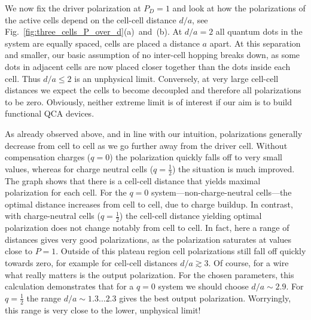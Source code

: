 We now fix the driver polarization at $P_D = 1$ and look at how the
polarizations of the active cells depend on the cell-cell distance $d/a$, see
Fig.~\ref{fig:three_cells_P_over_d}(a)~and~(b). At $d/a = 2$ all quantum dots in
the system are equally spaced, cells are placed a distance $a$ apart. At this
separation and smaller, our basic assumption of no inter-cell hopping breaks
down, as some dots in adjacent cells are now placed closer together than the
dots inside each cell. Thus $d/a \le 2$ is an unphysical limit. Conversely, at
very large cell-cell distances we expect the cells to become decoupled and
therefore all polarizations to be zero. Obviously, neither extreme limit is of
interest if our aim is to build functional QCA devices.

As already observed above, and in line with our intuition, polarizations
generally decrease from cell to cell as we go further away from the driver cell.
Without compensation charges ($q=0$) the polarization quickly falls off to very
small values, whereas for charge neutral cells ($q = \frac{1}{2}$) the situation
is much improved. The graph shows that there is a cell-cell distance that yields
maximal polarization for each cell. For the $q=0$ system---non-charge-neutral
cells---the optimal distance increases from cell to cell, due to charge buildup.
In contrast, with charge-neutral cells ($q=\frac{1}{2}$) the cell-cell distance
yielding optimal polarization does not change notably from cell to cell. In
fact, here a range of distances gives very good polarizations, as the
polarization saturates at values close to $P = 1$. Outside of this plateau
region cell polarizations still fall off quickly towards zero, for example for
cell-cell distances $d/a \gtrsim 3$. Of course, for a wire what really matters
is the output polarization. For the chosen parameters, this calculation
demonstrates that for a $q=0$ system we should choose $d/a \sim 2.9$. For
$q=\frac{1}{2}$ the range $d/a \sim 1.3 \ldots 2.3$ gives the best output
polarization. Worryingly, this range is very close to the lower, unphysical
limit!

